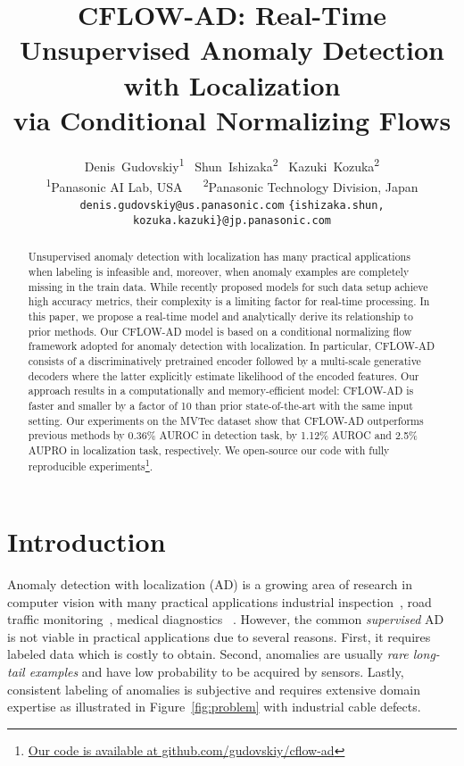\documentclass[10pt,twocolumn,letterpaper]{article}
\begin{document}
\title{CFLOW-AD: Real-Time Unsupervised Anomaly Detection with Localization\\ via Conditional Normalizing Flows}

\author{Denis~Gudovskiy\textsuperscript{\rm 1}
	\qquad~Shun~Ishizaka\textsuperscript{\rm 2}
	\qquad~Kazuki~Kozuka\textsuperscript{\rm 2}\\
	{\textsuperscript{\rm 1}Panasonic AI Lab, USA} ~~
	{\textsuperscript{\rm 2}Panasonic Technology Division, Japan} \\
	\small{\texttt{denis.gudovskiy@us.panasonic.com}}
	\qquad\small{\texttt{\{ishizaka.shun, kozuka.kazuki\}@jp.panasonic.com}}
}

\maketitle
\thispagestyle{empty}

\begin{abstract}
Unsupervised anomaly detection with localization has many practical applications when labeling is infeasible and, moreover, when anomaly examples are completely missing in the train data. While recently proposed models for such data setup achieve high accuracy metrics, their complexity is a limiting factor for real-time processing. In this paper, we propose a real-time model and analytically derive its relationship to prior methods. Our CFLOW-AD model is based on a conditional normalizing flow framework adopted for anomaly detection with localization. In particular, CFLOW-AD consists of a discriminatively pretrained encoder followed by a multi-scale generative decoders where the latter explicitly estimate likelihood of the encoded features. Our approach results in a computationally and memory-efficient model: CFLOW-AD is faster and smaller by a factor of 10 than prior state-of-the-art with the same input setting. Our experiments on the MVTec dataset show that CFLOW-AD outperforms previous methods by 0.36\% AUROC in detection task, by 1.12\% AUROC and 2.5\% AUPRO in localization task, respectively. We open-source our code with fully reproducible experiments\footnote{\href{https://github.com/gudovskiy/cflow-ad}{Our code is available at github.com/gudovskiy/cflow-ad}}.
\end{abstract}

\section{Introduction}
\label{sec:intro}
Anomaly detection with localization (AD) is a growing area of research in computer vision with many practical applications \eg industrial inspection~\cite{Bergmann_2019_CVPR}, road traffic monitoring~\cite{Li_2020_CVPR_Workshops}, medical diagnostics~\cite{zhou2020encoding} \etc. However, the common \textit{supervised} AD~\cite{Saleh13} is not viable in practical applications due to several reasons. First, it requires labeled data which is costly to obtain. Second, anomalies are usually \textit{rare long-tail examples} and have low probability to be acquired by sensors. Lastly, consistent labeling of anomalies is subjective and requires extensive domain expertise as illustrated in Figure~\ref{fig:problem} with industrial cable defects.
\end{document}
